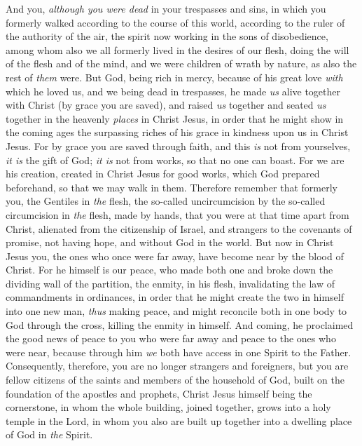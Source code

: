 \begin{biblechapter} %
 And you, \textit{although you were dead} in your trespasses and sins,
\verse in which you formerly walked according to the course of this world, according to the ruler of the authority of the air, the spirit now working in the sons of disobedience,
\verse among whom also we all formerly lived in the desires of our flesh, doing the will of the flesh and of the mind, and we were children of wrath by nature, as also the rest of \textit{them} were.
\verse But God, being rich in mercy, because of his great love \textit{with} which he loved us,
\verse and we being dead in trespasses, he made \textit{us} alive together with Christ (by grace you are saved),
\verse and raised \textit{us} together and seated \textit{us} together in the heavenly \textit{places} in Christ Jesus,
\verse in order that he might show in the coming ages the surpassing riches of his grace in kindness upon us in Christ Jesus.
\verse For by grace you are saved through faith, and this \textit{is} not from yourselves, \textit{it is} the gift of God;
\verse \textit{it is} not from works, so that no one can boast.
\verse For we are his creation, created in Christ Jesus for good works, which God prepared beforehand, so that we may walk in them.
 Therefore remember that formerly you, the Gentiles in \textit{the} flesh, the so-called uncircumcision by the so-called circumcision in \textit{the} flesh, made by hands,
\verse that you were at that time apart from Christ, alienated from the citizenship of Israel, and strangers to the covenants of promise, not having hope, and without God in the world.
\verse But now in Christ Jesus you, the ones who once were far away, have become near by the blood of Christ.
\verse For he himself is our peace, who made both one and broke down the dividing wall of the partition, the enmity, in his flesh,
\verse invalidating the law of commandments in ordinances, in order that he might create the two in himself into one new man, \textit{thus} making peace,
\verse and might reconcile both in one body to God through the cross, killing the enmity in himself.
\verse And coming, he proclaimed the good news of peace to you who were far away and peace to the ones who were near,
\verse because through him \textit{we} both have access in one Spirit to the Father.
\verse Consequently, therefore, you are no longer strangers and foreigners, but you are fellow citizens of the saints and members of the household of God,
\verse built on the foundation of the apostles and prophets, Christ Jesus himself being the cornerstone,
\verse in whom the whole building, joined together, grows into a holy temple in the Lord,
\verse in whom you also are built up together into a dwelling place of God in \textit{the} Spirit.
\end{biblechapter}

